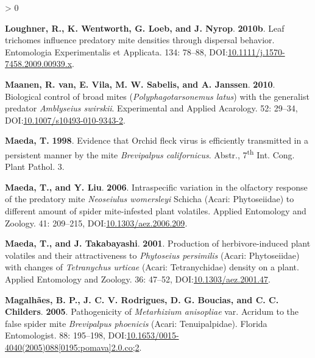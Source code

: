\documentclass{ufdissertation}[overrideChapters] %
\newlength{\cslhangindent}
\newenvironment{CSLReferences}[2] %
 {%
  \setlength{\parindent}{0pt}
  \ifodd #1 \everypar{\setlength{\hangindent}{\cslhangindent}}\ignorespaces\fi
  \ifnum #2 > 0
  \setlength{\parskip}{#2\baselineskip}
  \fi
 }%
 {}
\begin{document}
{\begin{CSLReferences}{1}{1}
\leavevmode{}%
\textbf{Loughner, R., K. Wentworth, G. Loeb, and J. Nyrop}. \textbf{2010b}. Leaf trichomes influence predatory mite densities through dispersal behavior. Entomologia Experimentalis et Applicata. 134: 78--88, DOI:\href{https://doi.org/10.1111/j.1570-7458.2009.00939.x}{10.1111/j.1570-7458.2009.00939.x}.

\leavevmode{}%
\textbf{Maanen, R. van, E. Vila, M. W. Sabelis, and A. Janssen}. \textbf{2010}. Biological control of broad mites ({\emph{Polyphagotarsonemus latus}}) with the generalist predator {\emph{Amblyseius swirskii}}. Experimental and Applied Acarology. 52: 29--34, DOI:\href{https://doi.org/10.1007/s10493-010-9343-2}{10.1007/s10493-010-9343-2}.

\leavevmode{}%
\textbf{Maeda, T.} \textbf{1998}. Evidence that {Orchid fleck virus} is efficiently transmitted in a persistent manner by the mite {\emph{Brevipalpus californicus}}. Abstr., 7\textsuperscript{th} Int. Cong. Plant Pathol. 3.

\leavevmode{}%
\textbf{Maeda, T., and Y. Liu}. \textbf{2006}. Intraspecific variation in the olfactory response of the predatory mite {\emph{Neoseiulus womersleyi}} {Schicha} {({Acari}: {Phytoseiidae})} to different amount of spider mite-infested plant volatiles. Applied Entomology and Zoology. 41: 209--215, DOI:\href{https://doi.org/10.1303/aez.2006.209}{10.1303/aez.2006.209}.

\leavevmode{}%
\textbf{Maeda, T., and J. Takabayashi}. \textbf{2001}. Production of herbivore-induced plant volatiles and their attractiveness to {\emph{Phytoseius persimilis}} {({Acari}: {Phytoseiidae})} with changes of {\emph{Tetranychus urticae}} {({Acari}: Tetranychidae)} density on a plant. Applied Entomology and Zoology. 36: 47--52, DOI:\href{https://doi.org/10.1303/aez.2001.47}{10.1303/aez.2001.47}.

\leavevmode{}%
\textbf{Magalhães, B. P., J. C. V. Rodrigues, D. G. Boucias, and C. C. Childers}. \textbf{2005}. Pathogenicity of {\emph{Metarhizium anisopliae}} var. Acridum to the false spider mite {\emph{Brevipalpus phoenicis}} ({Acari}: {Tenuipalpidae}). Florida Entomologist. 88: 195--198, DOI:\href{https://doi.org/10.1653/0015-4040(2005)088\%5B0195:pomava\%5D2.0.co;2}{10.1653/0015-4040(2005)088{[}0195:pomava{]}2.0.co;2}.


\end{CSLReferences}}
\end{document}
